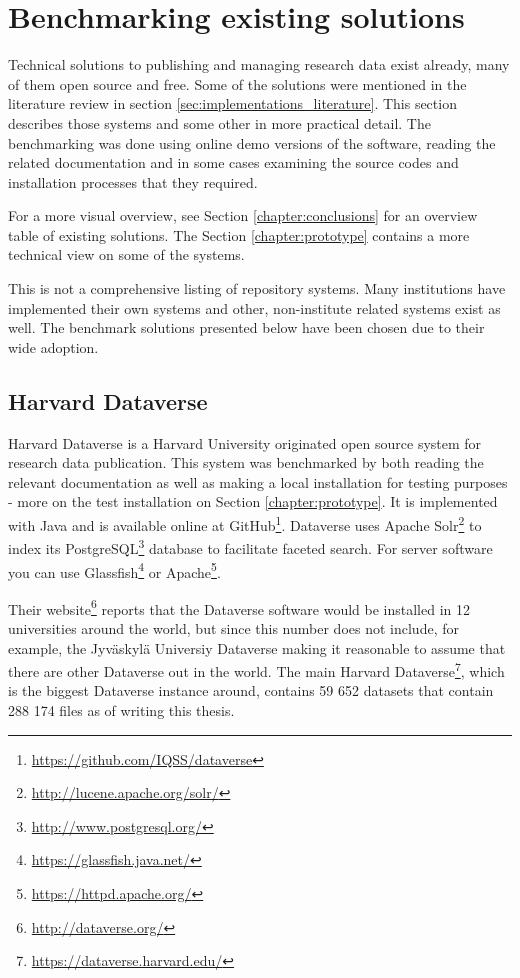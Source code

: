\section{Benchmarking existing solutions}
\label{sec:benchmarking}

Technical solutions to publishing and managing research data exist already, many
of them open source and free. Some of the solutions were mentioned in the
literature review in section \ref{sec:implementations_literature}. This section describes
those systems and some other in more practical detail. The benchmarking was
done using online demo versions of the software, reading the related
documentation and in some cases examining the source codes and installation
processes that they required.

For a more visual overview, see Section \ref{chapter:conclusions} for an
overview table of existing solutions. The Section \ref{chapter:prototype}
contains a more technical view on some of the systems.

This is not a comprehensive listing of repository systems. Many institutions
have implemented their own systems and other, non-institute related systems
exist as well. The benchmark solutions presented below have been chosen due to
their wide adoption.

\subsection{Harvard Dataverse}

Harvard Dataverse is a Harvard University originated open source system
for research data publication. This system was benchmarked by both reading the
relevant documentation as well as making a local installation for testing
purposes - more on the test installation on Section \ref{chapter:prototype}.
It is implemented with Java and is available
online at GitHub\footnote{\url{https://github.com/IQSS/dataverse}}. Dataverse
uses Apache Solr\footnote{\url{http://lucene.apache.org/solr/}} to index its
PostgreSQL\footnote{\url{http://www.postgresql.org/}} database to facilitate
faceted search. For server software you can use Glassfish\footnote{\url{https://glassfish.java.net/}}
or Apache\footnote{\url{https://httpd.apache.org/}}.

Their website\footnote{\url{http://dataverse.org/}} reports that the Dataverse
software would be installed in 12 universities around the world, but since this
number does not include, for example, the Jyväskylä Universiy Dataverse making
it reasonable to assume that there are other Dataverse out in the world. The
main Harvard Dataverse\footnote{\url{https://dataverse.harvard.edu/}}, which
is the biggest Dataverse instance around, contains 59 652 datasets that contain
288 174 files as of writing this thesis.

